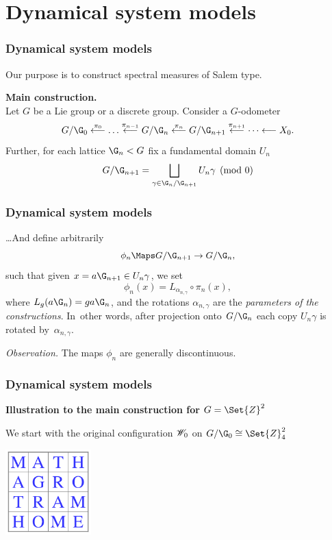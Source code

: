 \section{Dynamical system models}

\begin{frame}
  \frametitle{Dynamical system models}

  Our purpose is to construct spectral measures of Salem type.

  \bigskip
  {\bf Main construction.} \\
  Let $G$ be a Lie group or a discrete group. Consider a $G$-odometer
  $$
    G/\G_0 \stackrel{\pi_0}\longleftarrow \dots 
      \stackrel{\pi_{n-1}}\longleftarrow
    G/\G_n \stackrel{\pi_n}\longleftarrow
    G/\G_{n+1} \stackrel{\pi_{n+1}}\longleftarrow \dots
      \longleftarrow
    X_0.
  $$
  Further, for each lattice $\G_n < G$ 
  fix a fundamental domain $U_n$ %
  $$
    G/\G_{n+1} = \bigsqcup_{\gamma \in \G_n/\G_{n+1}} U_n\gamma \pmod{0} 
  $$
  
\end{frame}

\begin{frame}
  \frametitle{Dynamical system models}

  \dots And define arbitrarily 
  $$
    \phi_n \Maps G/\G_{n+1} \to G/\G_n, 
  $$
  such that given $x = a\G_{n+1} \in U_n\gamma$, we set 
  $$
    \phi_n(x) = L_{\alpha_{n,\gamma}} \mathbin{\circ} \pi_n(x), 
  $$
  where $L_g(a\G_n) = ga\G_n$, and the rotations $\alpha_{n,\gamma}$ are the 
  {\em parameters of the constructions}. In~other words, after projection onto $G/\G_n$ 
  each copy $U_n\gamma$ is rotated by~$\alpha_{n,\gamma}$. 
  
  \bigskip 
  {\it Observation.} The maps $\phi_n$ are generally discontinuous. 
  
\end{frame}

\begin{frame}
  \frametitle{Dynamical system models}

  {\bf Illustration to the main construction for $G = \Set{Z}^2$}
  
  \bigskip
  We start with the original configuration $\mathscr{W}_0$ on $G/\G_0 \cong \Set{Z}_4^2$ 
  
  \begin{center}
   \includegraphics[height=33mm]{pic1.jpg}
  \end{center}
  
\end{frame}


